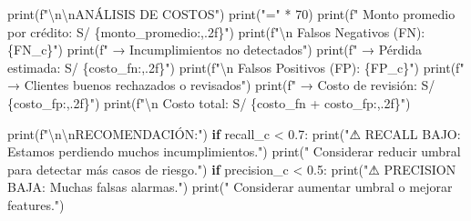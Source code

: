 \documentclass[
  doc,
  floatsintext,
  longtable,
  a4paper,
  nolmodern,
  notxfonts,
  notimes,
  12pt,
  colorlinks=true,linkcolor=blue,citecolor=blue,urlcolor=blue]{apa7}
\newenvironment{Shaded}{\begin{snugshade}}{\end{snugshade}}
\newcommand{\BuiltInTok}[1]{\textcolor[rgb]{0.00,0.23,0.31}{#1}}
\newcommand{\CharTok}[1]{\textcolor[rgb]{0.13,0.47,0.30}{#1}}
\newcommand{\ControlFlowTok}[1]{\textcolor[rgb]{0.00,0.23,0.31}{\textbf{#1}}}
\newcommand{\DecValTok}[1]{\textcolor[rgb]{0.68,0.00,0.00}{#1}}
\newcommand{\FloatTok}[1]{\textcolor[rgb]{0.68,0.00,0.00}{#1}}
\newcommand{\NormalTok}[1]{\textcolor[rgb]{0.00,0.23,0.31}{#1}}
\newcommand{\OperatorTok}[1]{\textcolor[rgb]{0.37,0.37,0.37}{#1}}
\newcommand{\SpecialCharTok}[1]{\textcolor[rgb]{0.37,0.37,0.37}{#1}}
\newcommand{\SpecialStringTok}[1]{\textcolor[rgb]{0.13,0.47,0.30}{#1}}
\newcommand{\StringTok}[1]{\textcolor[rgb]{0.13,0.47,0.30}{#1}}
\begin{document}
\begin{Shaded}
\begin{Highlighting}[]
\BuiltInTok{print}\NormalTok{(}\SpecialStringTok{f"}\CharTok{\textbackslash{}n\textbackslash{}n}\SpecialStringTok{ANÁLISIS DE COSTOS"}\NormalTok{)}
\BuiltInTok{print}\NormalTok{(}\StringTok{"="} \OperatorTok{*} \DecValTok{70}\NormalTok{)}
\BuiltInTok{print}\NormalTok{(}\SpecialStringTok{f"  Monto promedio por crédito: S/ }\SpecialCharTok{\{}\NormalTok{monto\_promedio}\SpecialCharTok{:,.2f\}}\SpecialStringTok{"}\NormalTok{)}
\BuiltInTok{print}\NormalTok{(}\SpecialStringTok{f"}\CharTok{\textbackslash{}n}\SpecialStringTok{  Falsos Negativos (FN): }\SpecialCharTok{\{}\NormalTok{FN\_c}\SpecialCharTok{\}}\SpecialStringTok{"}\NormalTok{)}
\BuiltInTok{print}\NormalTok{(}\SpecialStringTok{f"    → Incumplimientos no detectados"}\NormalTok{)}
\BuiltInTok{print}\NormalTok{(}\SpecialStringTok{f"    → Pérdida estimada: S/ }\SpecialCharTok{\{}\NormalTok{costo\_fn}\SpecialCharTok{:,.2f\}}\SpecialStringTok{"}\NormalTok{)}
\BuiltInTok{print}\NormalTok{(}\SpecialStringTok{f"}\CharTok{\textbackslash{}n}\SpecialStringTok{  Falsos Positivos (FP): }\SpecialCharTok{\{}\NormalTok{FP\_c}\SpecialCharTok{\}}\SpecialStringTok{"}\NormalTok{)}
\BuiltInTok{print}\NormalTok{(}\SpecialStringTok{f"    → Clientes buenos rechazados o revisados"}\NormalTok{)}
\BuiltInTok{print}\NormalTok{(}\SpecialStringTok{f"    → Costo de revisión: S/ }\SpecialCharTok{\{}\NormalTok{costo\_fp}\SpecialCharTok{:,.2f\}}\SpecialStringTok{"}\NormalTok{)}
\BuiltInTok{print}\NormalTok{(}\SpecialStringTok{f"}\CharTok{\textbackslash{}n}\SpecialStringTok{  Costo total: S/ }\SpecialCharTok{\{}\NormalTok{costo\_fn }\OperatorTok{+}\NormalTok{ costo\_fp}\SpecialCharTok{:,.2f\}}\SpecialStringTok{"}\NormalTok{)}

\BuiltInTok{print}\NormalTok{(}\SpecialStringTok{f"}\CharTok{\textbackslash{}n\textbackslash{}n}\SpecialStringTok{RECOMENDACIÓN:"}\NormalTok{)}
\ControlFlowTok{if}\NormalTok{ recall\_c }\OperatorTok{\textless{}} \FloatTok{0.7}\NormalTok{:}
    \BuiltInTok{print}\NormalTok{(}\StringTok{"⚠ RECALL BAJO: Estamos perdiendo muchos incumplimientos."}\NormalTok{)}
    \BuiltInTok{print}\NormalTok{(}\StringTok{"  Considerar reducir umbral para detectar más casos de riesgo."}\NormalTok{)}
\ControlFlowTok{if}\NormalTok{ precision\_c }\OperatorTok{\textless{}} \FloatTok{0.5}\NormalTok{:}
    \BuiltInTok{print}\NormalTok{(}\StringTok{"⚠ PRECISION BAJA: Muchas falsas alarmas."}\NormalTok{)}
    \BuiltInTok{print}\NormalTok{(}\StringTok{"  Considerar aumentar umbral o mejorar features."}\NormalTok{)}
\end{Highlighting}
\end{Shaded}
\end{document}
